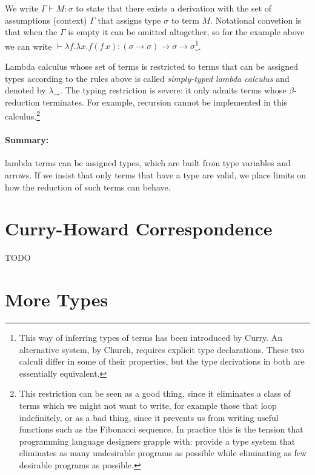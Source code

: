 \documentclass[11pt,twoside,a4paper]{article} %
\begin{document}
We write $\Gamma\vdash M:\sigma$ to state that there exists a derivation with 
the set of assumptions (context) $\Gamma$ that assigns type $\sigma$ to term $M$. 
Notational convetion is that when the $\Gamma$ is empty it
can be omitted altogether, so for the example above we can write
$\vdash \lambda f.\lambda
x.f(f\,x):(\sigma\rightarrow\sigma)\rightarrow\sigma\rightarrow\sigma$\footnote{This
way of inferring types of terms has been introduced by Curry. An alternative
system, by Church, requires explicit type declarations. These two calculi
differ in some of their properties, but the type derivations in both are essentially
equivalent\cite{su99}.}.

Lambda calculus whose set of terms is restricted to terms that can be
assigned types according to the rules above is called \emph{simply-typed lambda
calculus} and denoted by $\lambda_\rightarrow$. The typing restriction is
severe: it only admits terms whose $\beta$-reduction terminates. For example, recursion
cannot be implemented in this calculus.\footnote{This restriction can be seen as a good
thing, since it eliminates a class of terms which we might not want to write, for
example those that loop indefinitely, or as a bad thing, since it prevents us
from writing useful functions such as the Fibonacci sequence. In practice this
is the tension that programming language designers grapple with: provide a type
system that eliminates as many undesirable programs as possible while
eliminating as few desirable programs as possible.}

\paragraph{Summary:} lambda terms can be assigned types, which are built from
type variables and arrows. If we insist that only terms that have a type are 
valid, we place limits on how the reduction of such terms can behave.

\section{Curry-Howard Correspondence}

TODO

\section{More Types}
\end{document}
